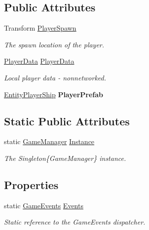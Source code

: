 \subsection*{Public Attributes}
\begin{DoxyCompactItemize}
\item 
Transform \hyperlink{class_skyrates_1_1_game_1_1_game_manager_ad4e11d1ee870d356ef6c38294f5d5e16}{Player\-Spawn}
\begin{DoxyCompactList}\small\item\em The spawn location of the player. \end{DoxyCompactList}\item 
\hyperlink{class_skyrates_1_1_data_1_1_player_data}{Player\-Data} \hyperlink{class_skyrates_1_1_game_1_1_game_manager_ad66cf44da1b4400f74853a247987a5df}{Player\-Data}
\begin{DoxyCompactList}\small\item\em Local player data -\/ nonnetworked. \end{DoxyCompactList}\item 
\hypertarget{class_skyrates_1_1_game_1_1_game_manager_a0b253df8947857d6e77732ecdb1353ca}{\hyperlink{class_skyrates_1_1_entity_1_1_entity_player_ship}{Entity\-Player\-Ship} {\bfseries Player\-Prefab}}\label{class_skyrates_1_1_game_1_1_game_manager_a0b253df8947857d6e77732ecdb1353ca}

\end{DoxyCompactItemize}
\subsection*{Static Public Attributes}
\begin{DoxyCompactItemize}
\item 
static \hyperlink{class_skyrates_1_1_game_1_1_game_manager}{Game\-Manager} \hyperlink{class_skyrates_1_1_game_1_1_game_manager_a5b1ce44932689e2e4b3ca18a238cc22e}{Instance}
\begin{DoxyCompactList}\small\item\em The Singleton\{\-Game\-Manager\} instance. \end{DoxyCompactList}\end{DoxyCompactItemize}
\subsection*{Properties}
\begin{DoxyCompactItemize}
\item 
static \hyperlink{class_skyrates_1_1_game_1_1_event_1_1_game_events}{Game\-Events} \hyperlink{class_skyrates_1_1_game_1_1_game_manager_acb90612bc562f5facb3218201154a35a}{Events}
\begin{DoxyCompactList}\small\item\em Static reference to the Game\-Events dispatcher. \end{DoxyCompactList}\end{DoxyCompactItemize}
